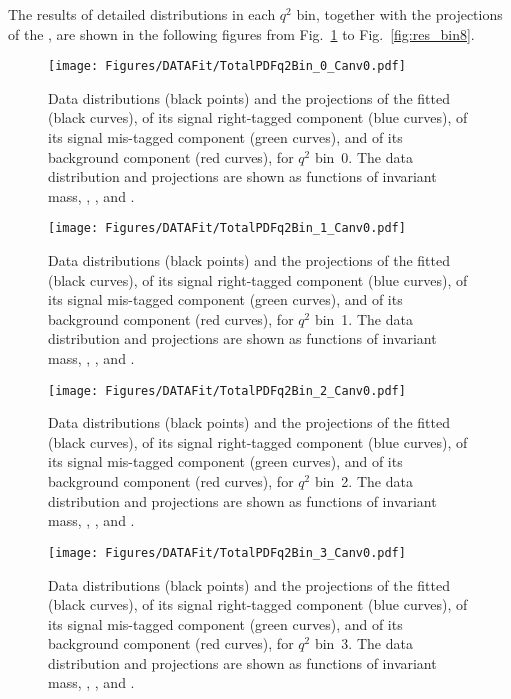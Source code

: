The results of detailed distributions in each $q^2$ bin, together with the projections of the \pdf, are shown in the following figures from Fig.~\ref{fig:res_bin0} to Fig.~\ref{fig:res_bin8}.

\begin{figure}
  \centering
  \texttt{[image: Figures/DATAFit/TotalPDFq2Bin\_0\_Canv0.pdf]}
  \caption{Data distributions (black points) and the projections of the fitted \pdf (black curves), of its signal right-tagged component (blue curves), of its signal mis-tagged component (green curves), and of its background component (red curves), for $q^2$ bin~0.
    The data distribution and \pdf projections are shown as functions of \PBz invariant mass, \cTL, \cTK, and \PHI.}
  \label{fig:res_bin0}
\end{figure}

\begin{figure}
  \centering
  \texttt{[image: Figures/DATAFit/TotalPDFq2Bin\_1\_Canv0.pdf]}
  \caption{Data distributions (black points) and the projections of the fitted \pdf (black curves), of its signal right-tagged component (blue curves), of its signal mis-tagged component (green curves), and of its background component (red curves), for $q^2$ bin~1.
    The data distribution and \pdf projections are shown as functions of \PBz invariant mass, \cTL, \cTK, and \PHI.}
  \label{fig:res_bin1}
\end{figure}


\begin{figure}
  \centering
  \texttt{[image: Figures/DATAFit/TotalPDFq2Bin\_2\_Canv0.pdf]}
  \caption{Data distributions (black points) and the projections of the fitted \pdf (black curves), of its signal right-tagged component (blue curves), of its signal mis-tagged component (green curves), and of its background component (red curves), for $q^2$ bin~2.
    The data distribution and \pdf projections are shown as functions of \PBz invariant mass, \cTL, \cTK, and \PHI.}
  \label{fig:res_bin2}
\end{figure}

\begin{figure}
  \centering
  \texttt{[image: Figures/DATAFit/TotalPDFq2Bin\_3\_Canv0.pdf]}
  \caption{Data distributions (black points) and the projections of the fitted \pdf (black curves), of its signal right-tagged component (blue curves), of its signal mis-tagged component (green curves), and of its background component (red curves), for $q^2$ bin~3.
    The data distribution and \pdf projections are shown as functions of \PBz invariant mass, \cTL, \cTK, and \PHI.}
  \label{fig:res_bin3}
\end{figure}

